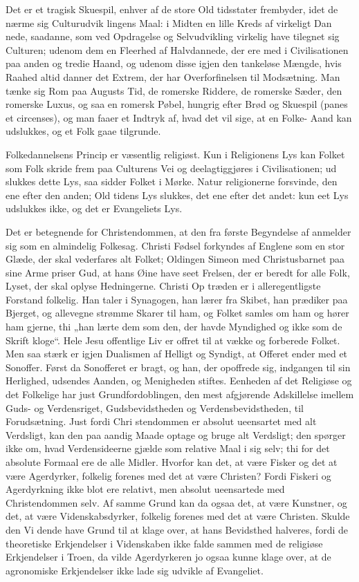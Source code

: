 \documentclass[12pt]{book}
\newcommand{\opage}[1]{\marginnote{\footnotesize\textit{[#1]}}}
\begin{document}
Det er et tragisk Skuespil, enhver af de store Old\-%
tidsstater frembyder, idet de nærme sig Culturudvik\-%
lingens Maal: i Midten en lille Kreds af virkeligt Dan\-%
nede, saadanne, som ved Opdragelse og Selvudvikling
\opage{52}\setcounter{footnote}{0}%
virkelig have tilegnet sig Culturen; udenom dem en
Fleerhed af Halvdannede, der ere med i Civilisationen
paa anden og tredie Haand, og udenom disse igjen den
tankeløse Mængde, hvis Raahed altid danner det Extrem,
der har Overforfinelsen til Modsætning. Man tænke sig
Rom paa Augusts Tid, de romerske Riddere, de romerske
Sæder, den romerske Luxus, og saa en romersk Pøbel,
hungrig efter Brød og Skuespil (panes et circenses), og
man faaer et Indtryk af, hvad det vil sige, at en Folke-%
Aand kan udslukkes, og et Folk gaae tilgrunde.

Folkedannelsens Princip er væsentlig religiøst. Kun
i Religionens Lys kan Folket som Folk skride frem paa
Culturens Vei og deelagtiggjøres i Civilisationen; ud\-%
slukkes dette Lys, saa sidder Folket i Mørke. Natur\-%
religionerne forsvinde, den ene efter den anden; Old\-%
tidens Lys slukkes, det ene efter det andet: kun eet
Lys udslukkes ikke, og det er Evangeliets Lys.

Det er betegnende for Christendommen, at den fra
første Begyndelse af anmelder sig som en almindelig
Folkesag. Christi Fødsel forkyndes af Englene som en
stor Glæde, der skal vederfares alt Folket; Oldingen
Simeon med Christusbarnet paa sine Arme priser Gud,
at hans Øine have seet Frelsen, der er beredt for alle
Folk, Lyset, der skal oplyse Hedningerne. Christi Op\-%
træden er i alleregentligste Forstand folkelig. Han taler
i Synagogen, han lærer fra Skibet, han prædiker paa
Bjerget, og allevegne strømme Skarer til ham, og Folket
samles om ham og hører ham gjerne, thi „han lærte dem
som den, der havde Myndighed og ikke som de Skrift\-%
kloge“. Hele Jesu offentlige Liv er offret til at vække og
forberede Folket. Men saa stærk er igjen Dualismen af
Helligt og Syndigt, at Offeret ender med et Sonoffer. Først
da Sonofferet er bragt, og han, der opoffrede sig, indgangen
til sin Herlighed, udsendes Aanden, og Menigheden stiftes.
\opage{53}\setcounter{footnote}{0}%
Eenheden af det Religiøse og det Folkelige har
just Grundfordoblingen, den mest afgjørende Adskillelse
imellem Guds- og Verdensriget, Gudsbevidstheden og
Verdensbevidstheden, til Forudsætning. Just fordi Chri\-%
stendommen er absolut ueensartet med alt Verdsligt, kan
den paa aandig Maade optage og bruge alt Verdsligt;
den spørger ikke om, hvad Verdensideerne gjælde som
relative Maal i sig selv; thi for det absolute Formaal
ere de alle Midler. Hvorfor kan det, at være Fisker og
det at være Agerdyrker, folkelig forenes med det at være
Christen? Fordi Fiskeri og Agerdyrkning ikke blot ere
relativt, men absolut ueensartede med Christendommen
selv. Af samme Grund kan da ogsaa det, at være
Kunstner, og det, at være Videnskabsdyrker, folkelig
forenes med det at være Christen. Skulde den Vi\-%
dende have Grund til at klage over, at hans Bevidsthed
halveres, fordi de theoretiske Erkjendelser i Videnskaben
ikke falde sammen med de religiøse Erkjendelser i Troen,
da vilde Agerdyrkeren jo ogsaa kunne klage over, at
de agronomiske Erkjendelser ikke lade sig udvikle af
Evangeliet.
\end{document}
